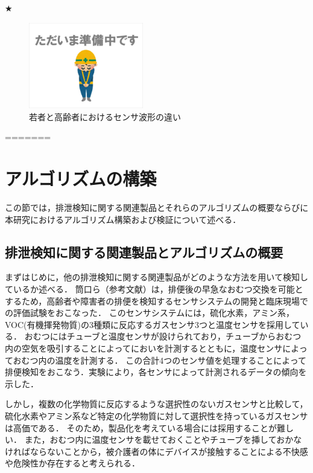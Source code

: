 ★
\begin{figure}[htbp]
   \centering
   \includegraphics[width=5cm]{./fig/temp.eps}
   \caption{若者と高齢者におけるセンサ波形の違い}
   \label{mic17a}
\end{figure}
=======
\section{アルゴリズムの構築}\label{chap:3.3}
この節では，排泄検知に関する関連製品とそれらのアルゴリズムの概要ならびに
本研究におけるアルゴリズム構築および検証について述べる．


\subsection{排泄検知に関する関連製品とアルゴリズムの概要}\label{chap:3.3.1}
まずはじめに，他の排泄検知に関する関連製品がどのような方法を用いて検知しているか述べる．
筒口ら（参考文献）は，排便後の早急なおむつ交換を可能とするため，高齢者や障害者の排便を検知するセンサシステムの開発と臨床現場での評価試験をおこなった．
このセンサシステムには，硫化水素，アミン系，VOC(有機揮発物質)の3種類に反応するガスセンサ3つと温度センサを採用している．
おむつにはチューブと温度センサが設けられており，チューブからおむつ内の空気を吸引することによってにおいを計測するとともに，温度センサによっておむつ内の温度を計測する．
この合計4つのセンサ値を処理することによって排便検知をおこなう．実験により，各センサによって計測されるデータの傾向を示した．\par
しかし，複数の化学物質に反応するような選択性のないガスセンサと比較して，硫化水素やアミン系など特定の化学物質に対して選択性を持っているガスセンサは高価である．
そのため，製品化を考えている場合には採用することが難しい．
また，おむつ内に温度センサを載せておくことやチューブを挿しておかなければならないことから，被介護者の体にデバイスが接触することによる不快感や危険性か存在すると考えられる．\par

